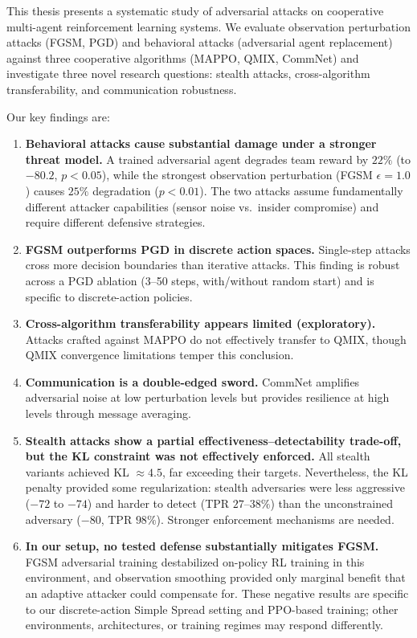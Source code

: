 \documentclass[12pt,a4paper]{article}
\begin{document}
This thesis presents a systematic study of adversarial attacks on cooperative multi-agent reinforcement learning systems. We evaluate observation perturbation attacks (FGSM, PGD) and behavioral attacks (adversarial agent replacement) against three cooperative algorithms (MAPPO, QMIX, CommNet) and investigate three novel research questions: stealth attacks, cross-algorithm transferability, and communication robustness.

Our key findings are:

\begin{enumerate}
    \item \textbf{Behavioral attacks cause substantial damage under a stronger threat model.} A trained adversarial agent degrades team reward by $22\%$ (to $-80.2$, $p < 0.05$), while the strongest observation perturbation (FGSM $\epsilon = 1.0$) causes $25\%$ degradation ($p < 0.01$). The two attacks assume fundamentally different attacker capabilities (sensor noise vs.\ insider compromise) and require different defensive strategies.

    \item \textbf{FGSM outperforms PGD in discrete action spaces.} Single-step attacks cross more decision boundaries than iterative attacks. This finding is robust across a PGD ablation (3--50 steps, with/without random start) and is specific to discrete-action policies.

    \item \textbf{Cross-algorithm transferability appears limited (exploratory).} Attacks crafted against MAPPO do not effectively transfer to QMIX, though QMIX convergence limitations temper this conclusion.

    \item \textbf{Communication is a double-edged sword.} CommNet amplifies adversarial noise at low perturbation levels but provides resilience at high levels through message averaging.

    \item \textbf{Stealth attacks show a partial effectiveness--detectability trade-off, but the KL constraint was not effectively enforced.} All stealth variants achieved KL $\approx 4.5$, far exceeding their targets. Nevertheless, the KL penalty provided some regularization: stealth adversaries were less aggressive ($-72$ to $-74$) and harder to detect (TPR $27$--$38\%$) than the unconstrained adversary ($-80$, TPR $98\%$). Stronger enforcement mechanisms are needed.

    \item \textbf{In our setup, no tested defense substantially mitigates FGSM.} FGSM adversarial training destabilized on-policy RL training in this environment, and observation smoothing provided only marginal benefit that an adaptive attacker could compensate for. These negative results are specific to our discrete-action Simple Spread setting and PPO-based training; other environments, architectures, or training regimes may respond differently.
\end{enumerate}
\end{document}
